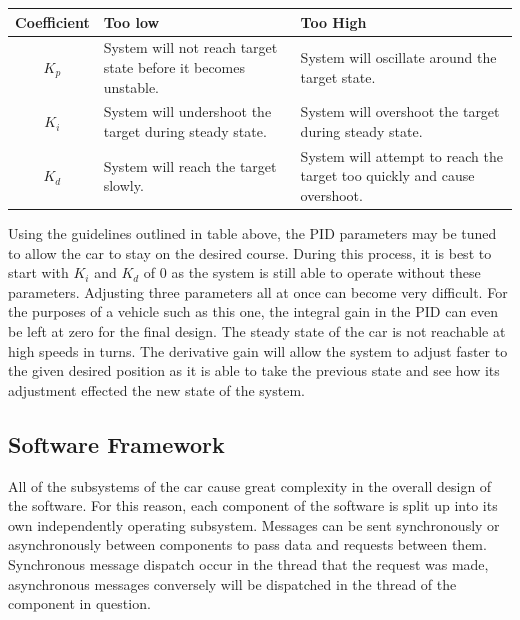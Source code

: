 \documentclass{article}
\begin{document}
\begin{table}[htb]
	\renewcommand{\arraystretch}{1.2}
	\begin{tabularx}{\columnwidth}{|c|>{\raggedright\arraybackslash}X|>{\raggedright\arraybackslash}X|}
		\hline
		Coefficient & Too low & Too High \\
		\hline
		$K_p$ & System will not reach target state before it becomes unstable. & System will oscillate around the target state. \\
		\hline
		$K_i$ & System will undershoot the target during steady state. & System will overshoot the target during steady state. \\
		\hline
		$K_d$ & System will reach the target slowly. & System will attempt to reach the target too quickly and cause overshoot. \\
		\hline
	\end{tabularx}
	\label{tab:pid}
\end{table}

Using the guidelines outlined in table above, the PID parameters may be tuned to allow the car to stay on the desired course. During this process, it is best to start with $K_i$ and $K_d$ of $0$ as the system is still able to operate without these parameters. Adjusting three parameters all at once can become very difficult. For the purposes of a vehicle such as this one, the integral gain in the PID can even be left at zero for the final design. The steady state of the car is not reachable at high speeds in turns. The derivative gain will allow the system to adjust faster to the given desired position as it is able to take the previous state and see how its adjustment effected the new state of the system. 

\subsection{Software Framework}

All of the subsystems of the car cause great complexity in the overall design of the software. For this reason, each component of the software is split up into its own independently operating subsystem. Messages can be sent synchronously or asynchronously between components to pass data and requests between them. Synchronous message dispatch occur in the thread that the request was made, asynchronous messages conversely will be dispatched in the thread of the component in question.
\end{document}
